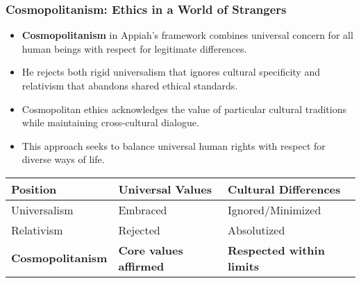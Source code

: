 \documentclass{beamer}
\begin{document}
	\begin{frame}
		\frametitle{Cosmopolitanism: Ethics in a World of Strangers}
		
		\begin{itemize}
			\item \textbf{Cosmopolitanism} in Appiah's framework combines universal concern for all human beings with respect for legitimate differences.
			\item He rejects both rigid universalism that ignores cultural specificity and relativism that abandons shared ethical standards.
			\item Cosmopolitan ethics acknowledges the value of particular cultural traditions while maintaining cross-cultural dialogue.
			\item This approach seeks to balance universal human rights with respect for diverse ways of life.
		\end{itemize}
		
		\begin{table}
			\begin{tabular}{lll}
				\toprule
				\textbf{Position} & \textbf{Universal Values} & \textbf{Cultural Differences} \\
				\midrule
				Universalism & Embraced & Ignored/Minimized \\
				Relativism & Rejected & Absolutized \\
				\textbf{Cosmopolitanism} & \textbf{Core values affirmed} & \textbf{Respected within limits} \\
				\bottomrule
			\end{tabular}
		\end{table}
		
	\end{frame}
\end{document}
